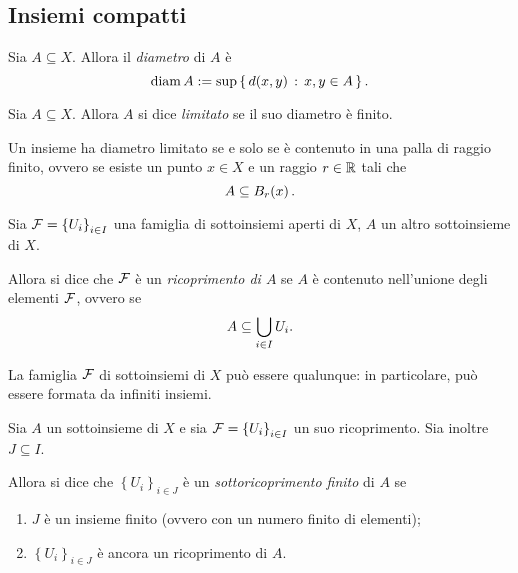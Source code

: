 \subsection{Insiemi compatti}

\begin{definition}[Diametro]
    Sia $A \subseteq X$. Allora il \emph{diametro} di $A$ è \[
        \diameter A \deq \sup \set{d(x, y) \suchthat x, y \in A}.
    \]
\end{definition}

\begin{definition}
    Sia $A \subseteq X$. Allora $A$ si dice \emph{limitato} se il suo diametro è finito.
\end{definition}

\begin{remark}
    Un insieme ha diametro limitato se e solo se è contenuto in una palla di raggio finito, ovvero se esiste un punto $x \in X$ e un raggio $r \in \R$ tali che \[
        A \subseteq \oB[r]{x}.    
    \]
\end{remark}

\begin{definition}
     \label{def:ricoprimento}
    Sia $\FF = \left\{U_i\right\}_{i \in I}$ una famiglia di sottoinsiemi aperti di $X$, $A$ un altro sottoinsieme di $X$. 
    
    Allora si dice che $\FF$ è un \emph{ricoprimento di $A$} se $A$ è contenuto nell'unione degli elementi $\FF$, ovvero se \[
        A \subseteq \bigunion_{i \in I} U_i.
    \] 
\end{definition}

La famiglia $\FF$ di sottoinsiemi di $X$ può essere qualunque: in particolare, può essere formata da infiniti insiemi.

\begin{definition}
     \label{def:sottoricoprimento_finito}
    Sia $A$ un sottoinsieme di $X$ e sia $\FF = \left\{U_i\right\}_{i \in I}$ un suo ricoprimento.     
    Sia inoltre $J \subseteq I$. 
    
    Allora si dice che $\left\{U_i\right\}_{i \in J}$ è un \emph{sottoricoprimento finito} di $A$ se
    \begin{enumerate}[label={(\roman*)}]
        \item $J$ è un insieme finito (ovvero con un numero finito di elementi);
        \item $\left\{U_i\right\}_{i \in J}$ è ancora un ricoprimento di $A$.
    \end{enumerate}
\end{definition}

